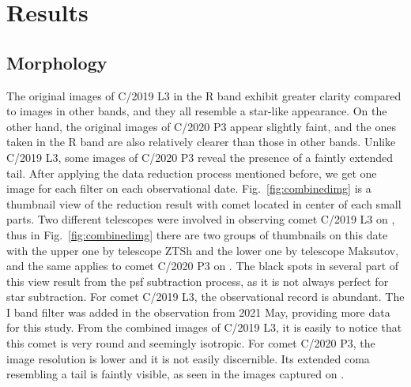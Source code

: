 \section{Results} \label{sec:res}

\subsection{Morphology}

The original images of C/2019 L3 in the R band exhibit greater clarity compared to images in other bands, and they all resemble a star-like appearance. On the other hand, the original images of C/2020 P3 appear slightly faint, and the ones taken in the R band are also relatively clearer than those in other bands. Unlike C/2019 L3, some images of C/2020 P3 reveal the presence of a faintly extended tail. After applying the data reduction process mentioned before, we get one image for each filter on each observational date. Fig.~\ref{fig:combinedimg} is a thumbnail view of the reduction result with comet located in center of each small parts. Two different telescopes were involved in observing comet C/2019 L3 on , thus in Fig.~\ref{fig:combinedimg} there are two groups of thumbnails on this date with the upper one by telescope ZTSh and the lower one by telescope Maksutov, and the same applies to comet C/2020 P3 on . The black spots in several part of this view result from the psf subtraction process, as it is not always perfect for star subtraction. For comet C/2019 L3, the observational record is abundant. The I band filter was added in the observation from 2021 May, providing more data for this study. From the combined images of C/2019 L3, it is easily to notice that this comet is very round and seemingly isotropic. For comet C/2020 P3, the image resolution is lower and it is not easily discernible. Its extended coma resembling a tail is faintly visible, as seen in the images captured on . 



